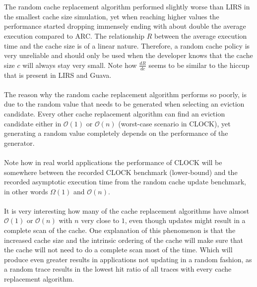 \documentclass[pdftex,a4paper,12pt,twoside]{report}
\begin{document}
\\\\
The random cache replacement algorithm performed slightly worse than LIRS in the smallest cache size simulation, yet when reaching higher values the performance started dropping immensely ending with about double the average execution compared to ARC. The relationship $R$ between the average execution time and the cache size is of a linear nature. Therefore, a random cache policy is very unreliable and should only be used when the developer knows that the cache size $c$ will always stay very small. Note how $\frac{dR}{dc}$ seems to be similar to the hiccup that is present in LIRS and Guava.
\\\\
The reason why the random cache replacement algorithm performs so poorly, is due to the random value that needs to be generated when selecting an eviction candidate. Every other cache replacement algorithm can find an eviction candidate either in $\mathcal{O}(1)$ or $\mathcal{O}(n)$ (worst-case scenario in CLOCK), yet generating a random value completely depends on the performance of the generator.
\\\\
Note how in real world applications the performance of CLOCK will be somewhere between the recorded CLOCK benchmark (lower-bound) and the recorded asymptotic execution time from the random cache update benchmark, in other words $\Omega(1)$ and $\mathcal{O}(n)$.
\\\\
It is very interesting how many of the cache replacement algorithms have almost $\mathcal{O}(1)$ or $\mathcal{O}(n)$ with $n$ very close to $1$, even though updates might result in a complete scan of the cache. One explanation of this phenomenon is that the increased cache size and the intrinsic ordering of the cache will make sure that the cache will not need to do a complete scan most of the time. Which will produce even greater results in applications not updating in a random fashion, as a random trace results in the lowest hit ratio of all traces with every cache replacement algorithm.
\end{document}
